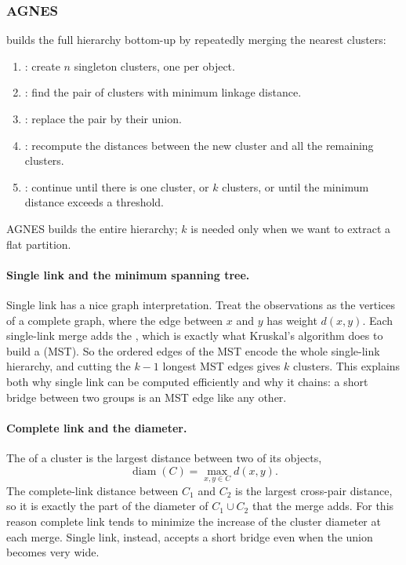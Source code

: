 \subsubsection{AGNES}

 builds the full hierarchy bottom-up by repeatedly merging the nearest clusters:
\begin{enumerate}
  \item {}: create $n$ singleton clusters, one per object.
  \item {}: find the pair of clusters with minimum linkage distance.
  \item {}: replace the pair by their union.
  \item {}: recompute the distances between the new cluster and all the remaining clusters.
  \item {}: continue until there is one cluster, or $k$ clusters, or until the minimum distance exceeds a threshold.
\end{enumerate}
AGNES builds the entire hierarchy; $k$ is needed only when we want to extract a flat partition.

\paragraph{Single link and the minimum spanning tree.} Single link has a nice graph interpretation. Treat the observations as the vertices of a complete graph, where the edge between $x$ and $y$ has weight $d(x,y)$. Each single-link merge adds the , which is exactly what Kruskal's algorithm does to build a  (MST). So the ordered edges of the MST encode the whole single-link hierarchy, and cutting the $k-1$ longest MST edges gives $k$ clusters. This explains both why single link can be computed efficiently and why it chains: a short bridge between two groups is an MST edge like any other.

\paragraph{Complete link and the diameter.} The  of a cluster is the largest distance between two of its objects,
\[
  \operatorname{diam}(C) = \max_{x, y \in C} d(x,y).
\]
The complete-link distance between $C_1$ and $C_2$ is the largest cross-pair distance, so it is exactly the part of the diameter of $C_1 \cup C_2$ that the merge adds. For this reason complete link tends to minimize the increase of the cluster diameter at each merge. Single link, instead, accepts a short bridge even when the union becomes very wide.


